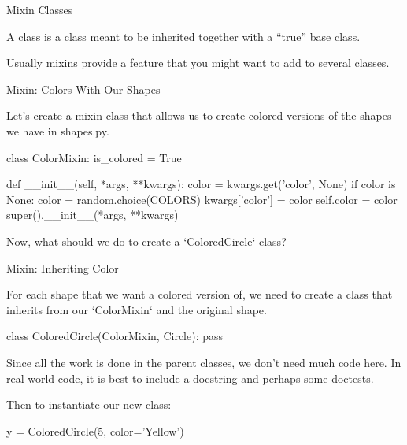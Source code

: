 \documentclass[aspectratio=149, handout] {beamer}
\begin{document}
\begin{frame}{Mixin Classes}
  
  A  class is a class meant to be inherited together with a ``true'' base class.
  
  \bigskip
  
  Usually mixins provide a feature that you might want to add to several classes.
  
\end{frame}


\begin{frame}[fragile]{Mixin: Colors With Our Shapes}
  
  Let's create a mixin class that allows us to create colored versions of the shapes we have in shapes.py.
  
  \begin{pythoncode}
    class ColorMixin:
        is_colored = True
    
        def __init__(self, *args, **kwargs):
            color = kwargs.get('color', None)
            if color is None:
                color = random.choice(COLORS)
                kwargs['color'] = color
            self.color = color
            super().__init__(*args, **kwargs)
    
  \end{pythoncode}

  \pause \medskip
  
  Now, what should we do to create a \inline`ColoredCircle` class?
  
\end{frame}


\begin{frame}[fragile]{Mixin: Inheriting Color}
  
  For each shape that we want a colored version of, 
  we need to create a class that inherits from our \inline`ColorMixin`
  and the original shape.
  
  \begin{pythoncode}
    class ColoredCircle(ColorMixin, Circle):
        pass

  \end{pythoncode}

  Since all the work is done in the parent classes,
  we don't need much code here.
  In real-world code, it is best to include a docstring and 
  perhaps some doctests.

  \pause \medskip
  
  Then to instantiate our new class:


  \begin{pythoncode}
    y = ColoredCircle(5, color='Yellow')
  \end{pythoncode}

\end{frame}
\end{document}
